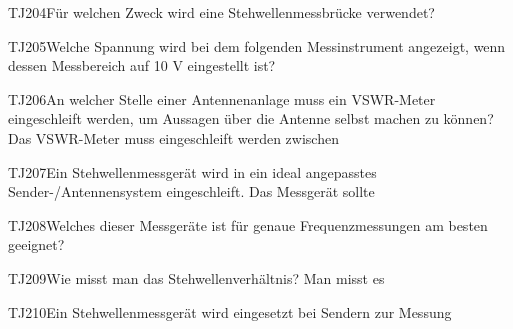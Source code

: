 \begin{question}{TJ204}{Für welchen Zweck wird eine Stehwellenmessbrücke verwendet?}
\end{question}

\begin{question}{TJ205}{Welche Spannung wird bei dem folgenden Messinstrument angezeigt, wenn dessen Messbereich auf 10 V eingestellt ist?}
\end{question}

\begin{question}{TJ206}{An welcher Stelle einer Antennenanlage muss ein VSWR-Meter eingeschleift werden, um Aussagen über die Antenne selbst machen zu können? Das VSWR-Meter muss eingeschleift werden zwischen}
\end{question}

\begin{question}{TJ207}{Ein Stehwellenmessgerät wird in ein ideal angepasstes Sender-/Antennensystem eingeschleift. Das Messgerät sollte}
\end{question}

\begin{question}{TJ208}{Welches dieser Messgeräte ist für genaue Frequenzmessungen am besten geeignet?}
\end{question}

\begin{question}{TJ209}{Wie misst man das Stehwellenverhältnis? Man misst es}
\end{question}

\begin{question}{TJ210}{Ein Stehwellenmessgerät wird eingesetzt bei Sendern zur Messung}
\end{question}

